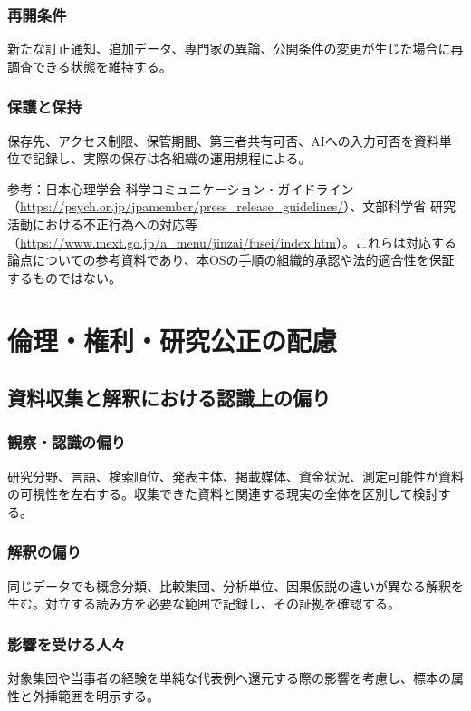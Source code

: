 \documentclass[a4paper,11pt]{article}
\begin{document}
\subsubsection{再開条件}
\par 新たな訂正通知、追加データ、専門家の異論、公開条件の変更が生じた場合に再調査できる状態を維持する。\par\medskip
\subsubsection{保護と保持}
\par 保存先、アクセス制限、保管期間、第三者共有可否、AIへの入力可否を資料単位で記録し、実際の保存は各組織の運用規程による。\par\medskip
\par 参考：日本心理学会 科学コミュニケーション・ガイドライン（\url{https://psych.or.jp/jpamember/press_release_guidelines/}）、文部科学省 研究活動における不正行為への対応等（\url{https://www.mext.go.jp/a_menu/jinzai/fusei/index.htm}）。これらは対応する論点についての参考資料であり、本OSの手順の組織的承認や法的適合性を保証するものではない。\par\medskip
\section{倫理・権利・研究公正の配慮}
\subsection{資料収集と解釈における認識上の偏り}
\subsubsection{観察・認識の偏り}
\par 研究分野、言語、検索順位、発表主体、掲載媒体、資金状況、測定可能性が資料の可視性を左右する。収集できた資料と関連する現実の全体を区別して検討する。\par\medskip
\subsubsection{解釈の偏り}
\par 同じデータでも概念分類、比較集団、分析単位、因果仮説の違いが異なる解釈を生む。対立する読み方を必要な範囲で記録し、その証拠を確認する。\par\medskip
\subsubsection{影響を受ける人々}
\par 対象集団や当事者の経験を単純な代表例へ還元する際の影響を考慮し、標本の属性と外挿範囲を明示する。\par\medskip
\end{document}
